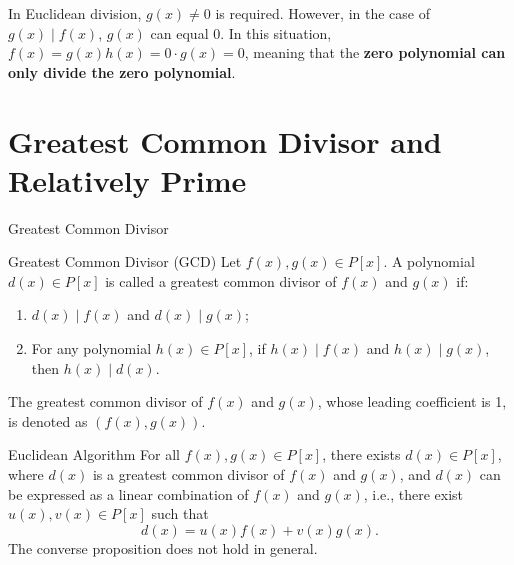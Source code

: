 \documentclass[11pt]{elegantbook}
\begin{document}
\begin{property}
    
\end{property}

\begin{caution}
    In Euclidean division, \( g(x) \neq 0 \) is required. 
    However, in the case of \( g(x) \mid f(x) \), \( g(x) \) can equal \( 0 \). 
    In this situation, \( f(x) = g(x)h(x) = 0 \cdot g(x) = 0 \), 
    meaning that the \textbf{zero polynomial can only divide the zero polynomial}.
\end{caution}

\section{Greatest Common Divisor and Relatively Prime}
\begin{leftbarTitle}{Greatest Common Divisor}\end{leftbarTitle}
\begin{definition}{Greatest Common Divisor (GCD)}
    Let \( f(x), g(x) \in P[x] \). 
    A polynomial \( d(x) \in P[x] \) is called a greatest common divisor of \( f(x) \) and \( g(x) \) if:
    \begin{enumerate}
        \item \( d(x) \mid f(x) \) and \( d(x) \mid g(x) \);
        \item For any polynomial \( h(x) \in P[x] \), 
            if \( h(x) \mid f(x) \) and \( h(x) \mid g(x) \), then \( h(x) \mid d(x) \).
    \end{enumerate}
    The greatest common divisor of \( f(x) \) and \( g(x) \), 
    whose leading coefficient is 1, is denoted as \( \left(f(x), g(x)\right) \).
\end{definition}

\begin{property}
    
\end{property}

\begin{theorem}{Euclidean Algorithm}
    For all \( f(x), g(x) \in P[x] \), there exists \( d(x) \in P[x] \), 
    where \( d(x) \) is a greatest common divisor of \( f(x) \) and \( g(x) \), 
    and \( d(x) \) can be expressed as a linear combination of \( f(x) \) and \( g(x) \), 
    i.e., there exist \( u(x), v(x) \in P[x] \) such that
    \[
    d(x) = u(x)f(x) + v(x)g(x).
    \]
    The converse proposition does not hold in general.
\end{theorem}
\end{document}
